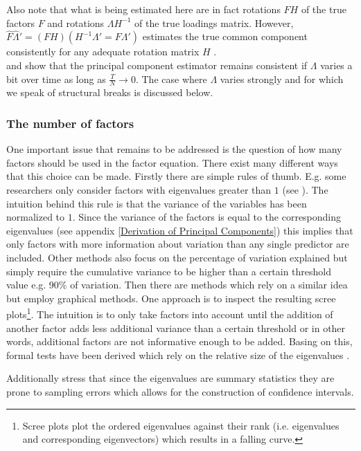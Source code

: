 \documentclass[12pt]{article}
\begin{document}
Also note that what is being estimated here are in fact rotations $FH$ of the true factors $F$ and rotations $\Lambda H^{-1}$ of the true loadings matrix. However, $\hat F \hat \Lambda' = (FH) (H^{-1}\Lambda' = F \Lambda')$ estimates the true common component consistently for any adequate rotation matrix $H$ \citep{bai2013principal}. \\

\citet{stock1998diffusion} and \citet{stock2002macroeconomic} show that the principal component estimator remains consistent if $\Lambda$ varies a bit over time as long as $\frac{T}{N} \to 0$. The case where $\Lambda$ varies strongly and for which we speak of structural breaks is discussed below.

\subsubsection{The number of factors}
One important issue that remains to be addressed is the question of how many factors should be used in the factor equation. There exist many different ways that this choice can be made. Firstly there are simple rules of thumb. E.g. some researchers only consider factors with eigenvalues greater than $1$ (see \citet{larsen2010estimating}). The intuition behind this rule is that the variance of the variables has been normalized to $1$. Since the variance of the factors is equal to the corresponding eigenvalues (see appendix \ref{Derivation of Principal Components}) this implies that only factors with more information about variation than any single predictor are included. Other methods also focus on the percentage of variation explained but simply require the cumulative variance to be higher than a certain threshold value e.g. 90\% of variation. Then there are methods which rely on a similar idea but employ graphical methods. One approach is to inspect the resulting scree plots\footnote{Scree plots plot the ordered eigenvalues against their rank  (i.e. eigenvalues and corresponding eigenvectors) which results in a falling curve.}. The intuition is to only take factors into account until the addition of another factor adds less additional variance than a certain threshold or in other words, additional factors are not informative enough to be added. Basing on this, formal tests have been derived which rely on the relative size of the eigenvalues \citep{stock2011dynamic}. 

Additionally \citet{larsen2010estimating} stress that since the eigenvalues are summary statistics they are prone to sampling errors which allows for the construction of confidence intervals.
\end{document}
